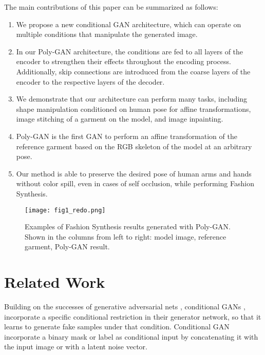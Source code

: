 \documentclass[11pt]{article}
\begin{document}
The main contributions of this paper can be summarized as follows:
\begin{enumerate}
\vspace{-0.12in}
\item We propose a new conditional GAN architecture, which can operate on multiple conditions that manipulate the generated image. 
\vspace{-0.015in}
\item In our Poly-GAN architecture, the conditions are fed to all layers of the encoder to strengthen their effects throughout the encoding process.  Additionally, skip connections are introduced from the coarse layers of the encoder to the respective layers of the decoder.
\vspace{-0.015in}
\item We demonstrate that our architecture can perform many tasks, including shape manipulation conditioned on human pose for affine transformations, image stitching of a garment on the model, and image inpainting.
\vspace{-0.015in}
\item Poly-GAN is the first GAN to perform  an affine transformation of the reference garment based on the RGB skeleton of the model at an arbitrary pose. 
\vspace{-0.01in}
\item  Our method is able to preserve the desired pose of human arms and hands without color spill, even in cases of self occlusion, while performing Fashion Synthesis.   
\end{enumerate}{}







\begin{figure}
 \begin{center}
  \texttt{[image: fig1\_redo.png]}
  \caption{Examples of Fashion Synthesis results generated with Poly-GAN. Shown in the columns from left to right: model image, reference garment, Poly-GAN result.}
  \label{fig:1}
  \end{center}
\end{figure}

\section{Related Work}
Building on the successes of generative adversarial nets \citet{GAN}, 
conditional GANs \citet{ConGAN},\citet{InfoGAN} incorporate a specific conditional restriction 
in their generator network, so that it learns to generate fake samples under that condition. 
Conditional GAN incorporate a binary mask or label as conditional input by concatenating it with the input image or with a latent noise vector.
\end{document}
